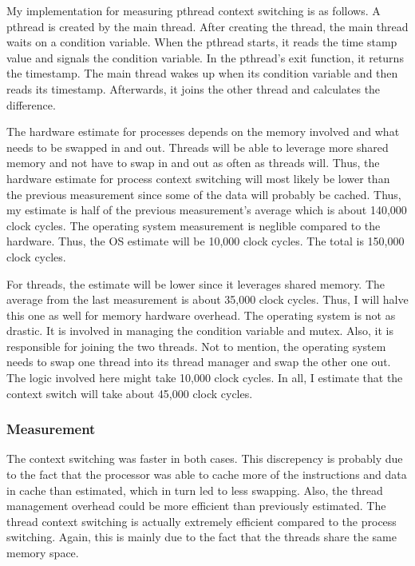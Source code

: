 \documentclass[paper=a4, fontsize=11pt]{scrartcl}
\numberwithin{equation}{section}        %
\numberwithin{figure}{section}          %
\numberwithin{table}{section}               %
\begin{document}
My implementation for measuring pthread context switching is as follows.  A pthread is created by the main thread.  After creating the thread, the main thread waits on a condition variable.  When the pthread starts, it reads the time stamp value and signals the condition variable.  In the pthread's exit function, it returns the timestamp.  The main thread wakes up when its condition variable and then reads its timestamp.  Afterwards, it joins the other thread and calculates the difference.

The hardware estimate for processes depends on the memory involved and what needs to be swapped in and out.  Threads will be able to leverage more shared memory and not have to swap in and out as often as threads will.  Thus, the hardware estimate for process context switching will most likely be lower than the previous measurement since some of the data will probably be cached.  Thus, my estimate is half of the previous measurement's average which is about 140,000 clock cycles.  The operating system measurement is neglible compared to the hardware.  Thus, the OS estimate will be 10,000 clock cycles.  The total is 150,000 clock cycles.

For threads, the estimate will be lower since it leverages shared memory.  The average from the last measurement is about 35,000 clock cycles.  Thus, I will halve this one as well for memory hardware overhead.  The operating system is not as drastic.  It is involved in managing the condition variable and mutex.  Also, it is responsible for joining the two threads.  Not to mention, the operating system needs to swap one thread into its thread manager and swap the other one out.  The logic involved here might take 10,000 clock cycles.  In all, I estimate that the context switch will take about 45,000 clock cycles.

\subsubsection{Measurement}

The context switching was faster in both cases.  This discrepency is probably due to the fact that the processor was able to cache more of the instructions and data in cache than estimated, which in turn led to less swapping.  Also, the thread management overhead could be more efficient than previously estimated.  The thread context switching is actually extremely efficient compared to the process switching.  Again, this is mainly due to the fact that the threads share the same memory space.
\end{document}

